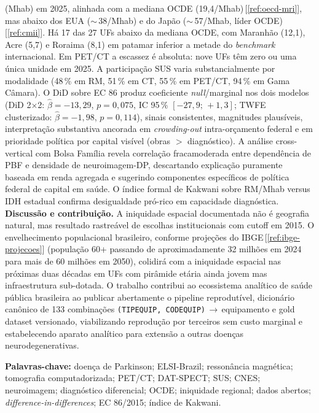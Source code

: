 \documentclass[12pt,a4paper,oneside]{article}
\begin{document}
\begin{singlespace}
(Mhab) em 2025, alinhada com a mediana OCDE
(19,4/Mhab)\,[\ref{ref:oecd-mri}], mas abaixo dos EUA
($\sim$\,38/Mhab) e do Japão ($\sim$\,57/Mhab, líder
OCDE)\,[\ref{ref:cmii}]. Há 17 das 27 UFs abaixo da mediana OCDE,
com Maranhão (12,1), Acre (5,7) e Roraima (8,1) em patamar inferior
a metade do \textit{benchmark} internacional. Em PET/CT a escassez
é absoluta: nove UFs têm zero ou uma única unidade em 2025. A
participação SUS varia substancialmente por modalidade (48\,\% em
RM, 51\,\% em CT, 55\,\% em PET/CT, 94\,\% em Gama Câmara). O DiD
sobre EC 86 produz coeficiente \textit{null}/marginal nos dois
modelos (DiD 2$\times$2: $\hat\beta = -13{,}29$, $p = 0{,}075$,
IC 95\,\% $[-27{,}9;\,+1{,}3]$; TWFE clusterizado:
$\hat\beta = -1{,}98$, $p = 0{,}114$), sinais consistentes,
magnitudes plausíveis, interpretação substantiva ancorada em
\textit{crowding-out} intra-orçamento federal e em prioridade
política por capital visível (obras $>$ diagnóstico). A análise
cross-vertical com Bolsa Família revela correlação
fraca\textendash moderada entre dependência de PBF e densidade de
neuroimagem-DP, descartando explicação puramente baseada em renda
agregada e sugerindo componentes específicos de política federal de
capital em saúde. O índice formal de Kakwani sobre RM/Mhab versus
IDH estadual confirma desigualdade pró-rico em capacidade
diagnóstica. \textbf{Discussão e contribuição.} A iniquidade
espacial documentada não é geografia natural, mas resultado
rastreável de escolhas institucionais com cutoff em 2015. O
envelhecimento populacional brasileiro, conforme projeções do
IBGE\,[\ref{ref:ibge-projecoes}] (população 60+ passando de
aproximadamente 32 milhões em 2024 para mais de 60 milhões em
2050), colidirá com a iniquidade espacial nas
próximas duas décadas em UFs com pirâmide etária ainda jovem mas
infraestrutura sub-dotada. O trabalho contribui ao ecossistema
analítico de saúde pública brasileira ao publicar abertamente o
pipeline reprodutível, dicionário canônico de 133 combinações
\texttt{(TIPEQUIP, CODEQUIP)}\,$\to$\,equipamento e gold dataset
versionado, viabilizando reprodução por terceiros sem custo
marginal e estabelecendo aparato analítico para extensão a outras
doenças neurodegenerativas.

\vspace{0.4cm}\noindent\textbf{Palavras-chave:}
doença de Parkinson; ELSI-Brazil; ressonância magnética; tomografia
computadorizada; PET/CT; DAT-SPECT; SUS; CNES; neuroimagem;
diagnóstico diferencial; OCDE; iniquidade regional; dados abertos;
\textit{difference-in-differences}; EC 86/2015; índice de Kakwani.
\end{singlespace}
\end{document}
